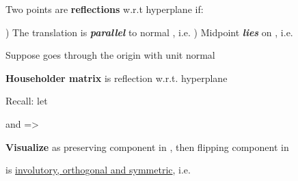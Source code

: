 \begin{itemize}

      \vItem
            Two points  are
            \textbf{reflections} w.r.t hyperplane
             if:

            \begin{enumerate}
                  )
                        The translation
                        is \textbf{\emph{parallel}} to normal ,
                        i.e. 
                  )
                        Midpoint 
                        \textbf{\emph{lies}} on ,
                        i.e. 
            \end{enumerate}
      \vItem
            Suppose
            goes through the origin with unit normal 

            \begin{itemize}

                  \vItem
                        \textbf{Householder matrix}
                        is reflection w.r.t. hyperplane 

                  \vItem
                        Recall: let

                        \tcbbreak

                        \begin{itemize}

                              \vItem
                                    and
                                    =>
                                    
                              \vItem
                                    \textbf{Visualize} as preserving component in
                                    , then flipping component in 
                        \end{itemize}
                  \vItem
                         is \ul{involutory, orthogonal and symmetric},
                        i.e. 
            \end{itemize}
\end{itemize}